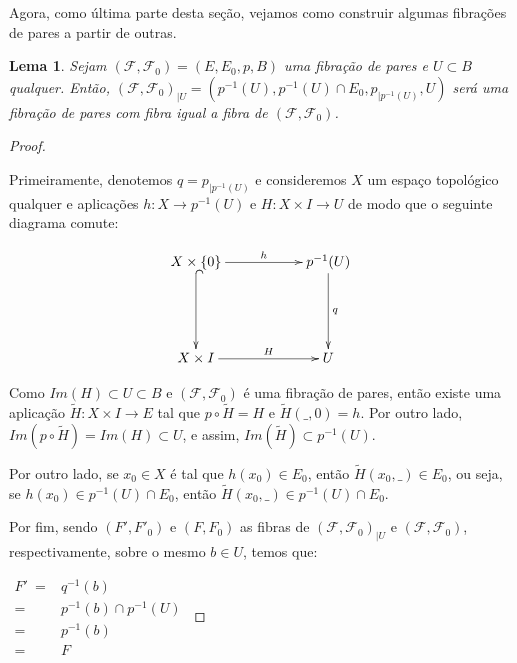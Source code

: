 \documentclass[12pt,oneside]{book} %
\newtheorem{lem}    {\hspace{0.5cm}Lema}[chapter]
\newcommand{\wt}{\widetilde}
\begin{document}
\par Agora, como última parte desta seção, vejamos como construir algumas fibrações de pares a partir de outras.

\begin{lem}\label{pf_restricao}
	Sejam $(\mathcal{F},\mathcal{F}_{0})=(E,E_{0},p,B)$ uma fibração de pares e $U\subset B$ qualquer. Então, $(\mathcal{F},\mathcal{F}_{0})_{|U}=(p^{-1}(U),p^{-1}(U)\cap E_{0},p_{|p^{-1}(U)},U)$ será uma fibração de pares com fibra igual a fibra de $(\mathcal{F},\mathcal{F}_{0})$.
\end{lem}
\begin{proof}
	
	\
	
	\par Primeiramente, denotemos $q=p_{|p^{-1}(U)}$ e consideremos $X$ um espaço topológico qualquer e aplicações $h:X\to p^{-1}(U)$ e $H:X\times I\to U$ de modo que o seguinte diagrama comute:
	
	$$ \xymatrix @C=0.5cm {
		X\times\{ 0 \} \ar[rrr]^-{h} \ar@{^(->}[dd] &&& p^{-1}(U) \ar[dd]^-{q} \\
		&&& \\
		X\times I \ar[rrr]^-{H} &&& U 
	}$$
	
	\par Como $Im(H)\subset U\subset B$ e $(\mathcal{F},\mathcal{F}_{0})$ é uma fibração de pares, então existe uma aplicação $\wt{H}:X\times I\to E$ tal que $p\circ\wt{H}=H$ e $\wt{H}(\_,0)=h$. Por outro lado, $Im(p\circ\wt{H})=Im(H)\subset U$, e assim, $Im(\wt{H})\subset p^{-1}(U)$.
	
	\par Por outro lado, se $x_{0}\in X$ é tal que $h(x_{0})\in E_{0}$, então $\wt{H}(x_{0},\_)\in E_{0}$, ou seja, se $h(x_{0})\in p^{-1}(U)\cap E_{0}$, então $\wt{H}(x_{0},\_)\in p^{-1}(U)\cap E_{0}$.
	
	\par Por fim, sendo $(F',F'_{0})$ e $(F,F_{0})$ as fibras de $(\mathcal{F},\mathcal{F}_{0})_{|U}$ e $(\mathcal{F},\mathcal{F}_{0})$, respectivamente, sobre o mesmo $b\in U$, temos que: \newline
	
	$\begin{array}{rl}
		F' \ = & q^{-1}(b) \\
		= & p^{-1}(b)\cap p^{-1}(U) \\
		= & p^{-1}(b) \\
		= & F
	\end{array}$
	

\end{proof}
\end{document}
